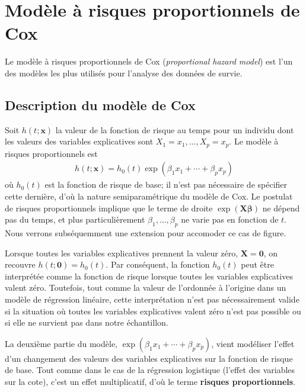 \documentclass[
  11pt,
  letterpaper,
]{scrbook}
\theoremstyle{definition}
\theoremstyle{remark}
\begin{document}
\section{Modèle à risques proportionnels de
Cox}\label{moduxe8le-uxe0-risques-proportionnels-de-cox}

Le modèle à risques proportionnels de Cox (\emph{proportional hazard
model}) est l'un des modèles les plus utilisés pour l'analyse des
données de survie.

\subsection{Description du modèle de
Cox}\label{description-du-moduxe8le-de-cox}

Soit \(h(t; \boldsymbol{x})\) la valeur de la fonction de risque au
temps pour un individu dont les valeurs des variables explicatives sont
\(X_1=x_1, \ldots, X_p=x_p\). Le modèle à risques proportionnels est
\begin{align*}
h(t; \boldsymbol{x}) = h_0(t)\exp(\beta_1x_1 + \cdots + \beta_p x_p)
\end{align*} où \(h_0(t)\) est la fonction de risque de base; il n'est
pas nécessaire de spécifier cette dernière, d'où la nature
semiparamétrique du modèle de Cox. Le postulat de risques proportionnels
implique que le terme de droite \(\exp(\mathbf{X}\boldsymbol{\beta})\)
ne dépend pas du temps, et plus particulièrement
\(\beta_1, \ldots, \beta_p\) ne varie pas en fonction de \(t\). Nous
verrons subséquemment une extension pour accomoder ce cas de figure.

Lorsque toutes les variables explicatives prennent la valeur zéro,
\(\boldsymbol{X}=\boldsymbol{0}\), on recouvre
\(h(t; \boldsymbol{0})= h_0(t)\). Par conséquent, la fonction \(h_0(t)\)
peut être interprétée comme la fonction de risque lorsque toutes les
variables explicatives valent zéro. Toutefois, tout comme la valeur de
l'ordonnée à l'origine dans un modèle de régression linéaire, cette
interprétation n'est pas nécessairement valide si la situation où toutes
les variables explicatives valent zéro n'est pas possible ou si elle ne
survient pas dans notre échantillon.

La deuxième partie du modèle,
\(\exp(\beta_1x_1 + \cdots + \beta_p x_p)\), vient modéliser l'effet
d'un changement des valeurs des variables explicatives sur la fonction
de risque de base. Tout comme dans le cas de la régression logistique
(l'effet des variables sur la cote), c'est un effet multiplicatif, d'où
le terme \textbf{risques proportionnels}.
\end{document}
